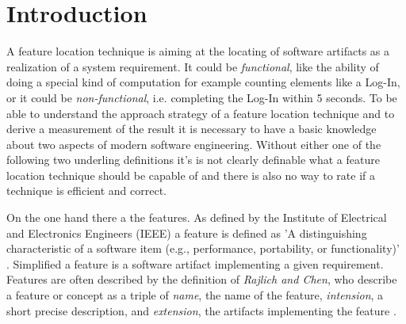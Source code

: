 \chapter{Introduction}


A feature location technique is aiming at the locating of software artifacts as a realization of a system requirement. It could be \emph{functional}, like the ability of doing a special kind of computation for example counting elements like a Log-In, or it could be \emph{non-functional}, i.e. completing the Log-In within 5 seconds.
To be able to understand the approach strategy of a feature location technique and to derive a measurement of the result it is necessary to have a basic knowledge about two aspects of modern software engineering. Without either one of the following two underling definitions it's is not clearly definable what a feature location technique should be capable of and there is also no way to rate if a technique is efficient and correct.

On the one hand there a the features. As defined by the Institute of Electrical and Electronics Engineers (IEEE) a feature is defined as 'A distinguishing characteristic of a software item (e.g., performance, portability, or functionality)' \cite{wiki:Softwarefeature}. Simplified a feature is a software artifact implementing a given requirement. Features are often described by the definition of \emph{Rajlich and Chen}, who describe a feature or concept as a triple of \textit{name}, the name of the feature, \textit{intension}, a short precise description, and \textit{extension}, the artifacts implementing the feature \cite{KR00} \label{Rajlich_Chen}.

